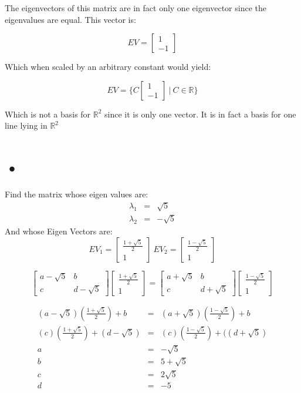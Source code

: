 \documentclass[12pt]{article}
\begin{document}
The eigenvectors of this matrix are in fact only one eigenvector since the eigenvalues are equal. This vector is:

\[
EV = 
\begin{bmatrix}
1\\
-1
\end{bmatrix}
\]

Which when scaled by an arbitrary constant would yield:

\[
EV = \{ C
\begin{bmatrix}
1\\
-1
\end{bmatrix}
\ | \
C \in \mathbb{R \}}
\]

Which is not a basis for $\mathbb{R}^2$ since it is only one vector. It is in fact a basis for one line lying in $\mathbb{R}^2$

\section{•}

Find the matrix whose eigen values are:
\begin{eqnarray*}
\lambda_1 &=& \sqrt{5}\\
\lambda_2 &=& -\sqrt{5}
\end{eqnarray*}
And whose Eigen Vectors are:
\[
EV_1 = 
\begin{bmatrix}
\frac{1 + \sqrt{5}}{2} \\
1
\end{bmatrix}
\ EV_2 =
\begin{bmatrix}
\frac{1 - \sqrt{5}}{2} \\
1
\end{bmatrix}
\]

\[
\begin{bmatrix}
a - \sqrt{5} & b\\
c & d - \sqrt{5}
\end{bmatrix}
\begin{bmatrix}
\frac{1 + \sqrt{5}}{2} \\
1
\end{bmatrix}
=
\begin{bmatrix}
a + \sqrt{5} & b\\
c & d + \sqrt{5}
\end{bmatrix}
\begin{bmatrix}
\frac{1 - \sqrt{5}}{2} \\
1
\end{bmatrix}
\]

\begin{eqnarray*}
(a - \sqrt{5})(\frac{1 + \sqrt{5}}{2}) + b &=& (a + \sqrt{5})(\frac{1 - \sqrt{5}}{2}) + b\\
(c)(\frac{1 + \sqrt{5}}{2}) + (d - \sqrt{5}) &=& (c)(\frac{1 - \sqrt{5}}{2}) + ((d + \sqrt{5})\\
a &=& -\sqrt{5} \\
b &=& 5 + \sqrt{5} \\
c &=& 2\sqrt{5}\\
d &=& -5\\
\end{eqnarray*}
\end{document}

